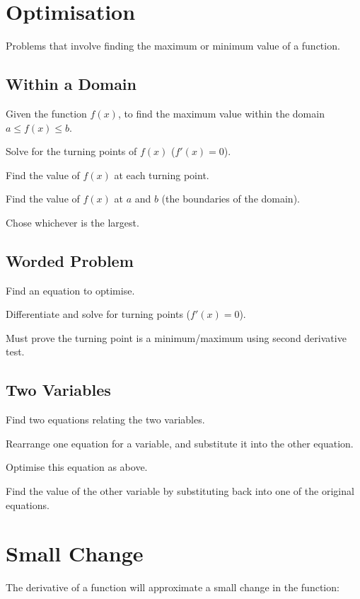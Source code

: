 \documentclass[a4paper,11pt]{article}
\begin{document}
\section{Optimisation}

Problems that involve finding the maximum or minimum value of a function.


\subsection{Within a Domain}

Given the function $f(x)$, to find the maximum value within the domain
$a \leq f(x) \leq b$.

Solve for the turning points of $f(x)$ ($f'(x) = 0$).

Find the value of $f(x)$ at each turning point.

Find the value of $f(x)$ at $a$ and $b$ (the boundaries of the domain).

Chose whichever is the largest.


\subsection{Worded Problem}

Find an equation to optimise.

Differentiate and solve for turning points ($f'(x) = 0$).

Must prove the turning point is a minimum/maximum using second derivative test.


\subsection{Two Variables}

Find two equations relating the two variables.

Rearrange one equation for a variable, and substitute it into the other
equation.

Optimise this equation as above.

Find the value of the other variable by substituting back into one of the
original equations.




\section{Small Change}

The derivative of a function will approximate a small change in the function:
\end{document}
